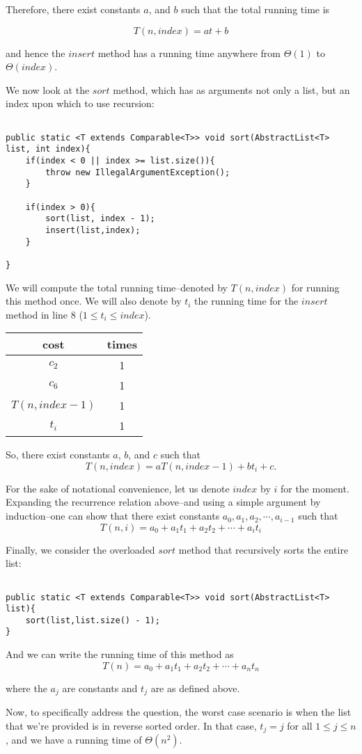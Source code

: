 \documentclass{article}
\begin{document}
\bigskip
\bigskip

Therefore, there exist constants $a$, and $b$ such that the total running time is

\[
	T(n,index) = a t + b
\]

\noindent and hence the $insert$ method has a running time anywhere from $\Theta(1)$ to $\Theta(index)$.

We now look at the $sort$ method, which has as arguments not only a list, but an index upon which to use recursion:

\begin{verbatim}

public static <T extends Comparable<T>> void sort(AbstractList<T> list, int index){
	if(index < 0 || index >= list.size()){
		throw new IllegalArgumentException();
	}
	
	if(index > 0){
		sort(list, index - 1);
		insert(list,index);
	}
	
}

\end{verbatim}

We will compute the total running time--denoted by $T(n,index)$ for running this method once. We will also denote by $t_i$ the running time for the $insert$ method in line 8 ($1 \leq t_i \leq index$).

\begin{tabular}{|c|c|}
\hline 
cost & times \\ 
\hline 
$c_2$ & 1 \\ 
\hline 
$c_6$ & 1 \\ 
\hline 
$T(n,index - 1)$ & 1 \\ 
\hline 
$t_i$ & 1 \\ 
\hline 
\end{tabular} 

So, there exist constants $a$, $b$, and $c$ such that
\[
	T(n,index) = aT(n,index - 1) + b t_i + c.
\]

For the sake of notational convenience, let us denote $index$ by $i$ for the moment. Expanding the recurrence relation above--and using a simple argument by induction--one can show that there exist constants $a_0, a_1,a_2,\cdots,a_{i-1}$ such that
\[
	T(n,i) = a_0 + a_1 t_1 + a_2 t_2 + \cdots + a_i t_i
\]


Finally, we consider the overloaded $sort$ method that recursively sorts the entire list:

\begin{verbatim}

public static <T extends Comparable<T>> void sort(AbstractList<T> list){
	sort(list,list.size() - 1);
}

\end{verbatim}

And we can write the running time of this method as
\[
	T(n) = a_0 + a_1 t_1 + a_2 t_2 + \cdots + a_n t_n
\]

\noindent where the $a_j$ are constants and $t_j$ are as defined above.

Now, to specifically address the question, the worst case scenario is when the list that we're provided is in reverse sorted order. In that case, $t_j = j$ for all $1 \leq j \leq n$, and we have a running time of $\Theta(n^2)$. 
\end{document}
